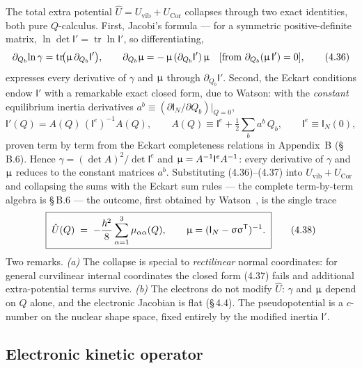 The total extra potential $\hat U=U_{\mathrm{vib}}+U_{\mathrm{Cor}}$ collapses through two exact identities, both pure $Q$-calculus. First, Jacobi's formula --- for a symmetric positive-definite matrix, $\ln\det\mathsf I'=\operatorname{tr}\ln\mathsf I'$, so differentiating,
\begin{equation}
\partial_{Q_b}\!\ln\gamma=\operatorname{tr}\!\bigl(\upmu\,\partial_{Q_b}\mathsf I'\bigr),
\qquad
\partial_{Q_b}\upmu=-\,\upmu\,(\partial_{Q_b}\mathsf I')\,\upmu
\quad[\text{from }\partial_{Q_b}(\upmu\,\mathsf I')=0], \tag{4.36}
\end{equation}
expresses every derivative of $\gamma$ and $\upmu$ through $\partial_{Q_b}\mathsf I'$. Second, the Eckart conditions endow $\mathsf I'$ with a remarkable exact closed form, due to Watson: with the \emph{constant} equilibrium inertia derivatives $a^{b}\equiv(\partial\mathsf I_N/\partial Q_b)|_{Q=0}$,
\begin{equation}
\mathsf I'(Q)=A(Q)\,(\mathsf I^{e})^{-1}A(Q),\qquad
A(Q)\equiv\mathsf I^{e}+\tfrac12\sum_b a^{b}\,Q_b,\qquad
\mathsf I^{e}\equiv\mathsf I_N(0), \tag{4.37}
\end{equation}
proven term by term from the Eckart completeness relations in Appendix~B (\S\,B.6). Hence $\gamma=(\det A)^2/\det\mathsf I^{e}$ and $\upmu=A^{-1}\mathsf I^{e}A^{-1}$: every derivative of $\gamma$ and $\upmu$ reduces to the constant matrices $a^{b}$. Substituting (4.36)--(4.37) into $U_{\mathrm{vib}}+U_{\mathrm{Cor}}$ and collapsing the sums with the Eckart sum rules --- the complete term-by-term algebra is \S\,B.6 --- the outcome, first obtained by Watson~\cite{watson1968}, is the single trace
\begin{equation}
\boxed{\;\hat U(Q)\;=\;-\frac{\hbar^{2}}{8}\sum_{\alpha=1}^{3}\mu_{\alpha\alpha}(Q),\qquad \upmu=(\mathsf{I}_N-\upsigma\upsigma^{\mathsf T})^{-1}.\;} \tag{4.38}
\end{equation}
Two remarks. \emph{(a)} The collapse is special to \emph{rectilinear} normal coordinates: for general curvilinear internal coordinates the closed form (4.37) fails and additional extra-potential terms survive. \emph{(b)} The electrons do not modify $\hat U$: $\gamma$ and $\upmu$ depend on $Q$ alone, and the electronic Jacobian is flat (\S\,4.4). The pseudopotential is a $c$-number on the nuclear shape space, fixed entirely by the modified inertia $\mathsf I'$.

\subsection{Electronic kinetic operator}

